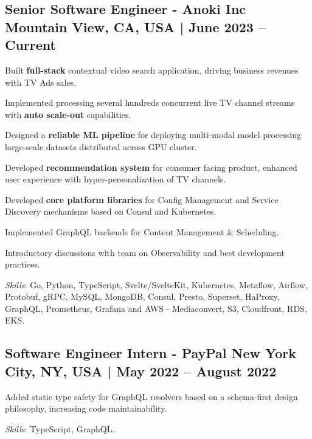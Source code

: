 \subsection{{Senior Software Engineer - Anoki Inc \hfill  Mountain View, CA, USA  | June 2023 -- Current}}
\begin{zitemize}
\item Built \textbf{full-stack} contextual video search application, driving business revenues with TV Ads sales.
\item Implemented processing several hundreds concurrent live TV channel streams with \textbf{auto scale-out} capabilities.
\item Designed a \textbf{reliable ML pipeline} for deploying multi-modal model processing large-scale datasets distributed across GPU cluster. 
\item Developed \textbf{recommendation system} for consumer facing product, enhanced user experience with hyper-personalization of TV channels.
\item Developed \textbf{core platform libraries} for Config Management and Service Discovery mechanisms based on Consul and Kubernetes.
\item Implemented GraphQL backends for Content Management \& Scheduling.
\item Introductory discussions with team on Observability and best development practices.
\end{zitemize}
\textit{Skills}: Go, Python, TypeScript, Svelte/SvelteKit, Kubernetes, Metaflow, Airflow, Protobuf, gRPC, MySQL, MongoDB, Consul, Presto, Superset, HaProxy, GraphQL, Prometheus, Grafana and AWS - Mediaconvert, S3, Cloudfront, RDS, EKS.
\vspace*{2mm}
\subsection{{Software Engineer Intern - PayPal \hfill New York City, NY, USA | May 2022 -- August 2022}}
\begin{zitemize}
\item Added static type safety for GraphQL resolvers based on a schema-first design philosophy, increasing code maintainability.
\end{zitemize}

\textit{Skills}: TypeScript, GraphQL.
\vspace*{1mm}

